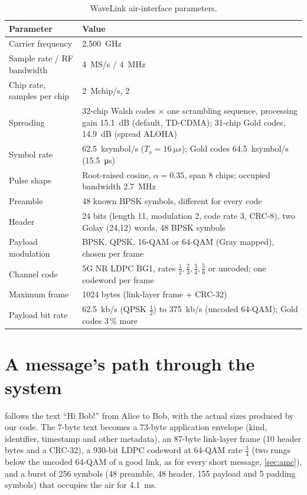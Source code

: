 \documentclass[11pt,a4paper,oneside]{report}
\begin{document}
\begin{table}[htbp]
\centering\small
\caption{WaveLink air-interface parameters.}\label{tab:phy}
\begin{tabularx}{0.88\linewidth}{@{}lL@{}}
\toprule
\textbf{Parameter} & \textbf{Value}\\
\midrule
Carrier frequency & \SI{2.500}{GHz}\\
Sample rate / RF bandwidth & \SI{4}{MS/s} / \SI{4}{MHz}\\
Chip rate, samples per chip & \SI{2}{Mchip/s}, 2\\
Spreading & 32-chip Walsh codes $\times$ one scrambling sequence, processing gain \SI{15.1}{dB}
  (default, TD-CDMA); 31-chip Gold codes, \SI{14.9}{dB} (spread ALOHA)\\
Symbol rate & \SI{62.5}{ksymbol/s} ($T_s=\SI{16}{\micro s}$); Gold codes \SI{64.5}{ksymbol/s} (\SI{15.5}{\micro s})\\
Pulse shape & Root-raised cosine, $\alpha=0.35$, span 8 chips; occupied bandwidth \SI{2.7}{MHz}\\
Preamble & 48 known BPSK symbols, different for every code\\
Header & 24 bits (length 11, modulation 2, code rate 3, CRC-8), two Golay (24,12) words, 48 BPSK symbols\\
Payload modulation & BPSK, QPSK, 16-QAM or 64-QAM (Gray mapped), chosen per frame\\
Channel code & 5G NR LDPC BG1, rates $\tfrac12,\tfrac23,\tfrac34,\tfrac56$ or uncoded; one codeword per frame\\
Maximum frame & \num{1024} bytes (link-layer frame + CRC-32)\\
Payload bit rate & \SI{62.5}{kb/s} (QPSK $\tfrac12$) to \SI{375}{kb/s} (uncoded 64-QAM); Gold codes 3\,\% more\\
\bottomrule
\end{tabularx}
\end{table}

\section{A message's path through the system}\label{sec:journey}
 follows the text ``Hi Bob!'' from Alice to Bob, with the actual sizes produced by our
code. The 7-byte text becomes a 73-byte application envelope (kind, identifier, timestamp and other
metadata), an 87-byte link-layer frame (10 header bytes and a CRC-32), a 930-bit LDPC codeword at
64-QAM rate $\tfrac34$ (two rungs below the uncoded 64-QAM of a good link, as for every short message,
\cref{sec:amc}), and a burst of 256 symbols (48 preamble, 48 header, 155 payload and 5 padding
symbols) that occupies the air for \SI{4.1}{ms}.
\end{document}
